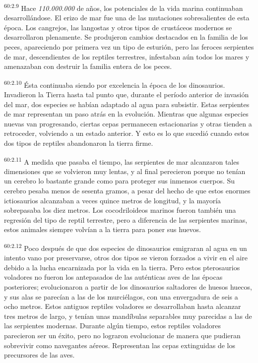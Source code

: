 \par
\textsuperscript{60:2.9} Hace \textit{110.000.000} de años, los potenciales de la vida marina continuaban desarrollándose. El erizo de mar fue una de las mutaciones sobresalientes de esta época. Los cangrejos, las langostas y otros tipos de crustáceos modernos se desarrollaron plenamente. Se produjeron cambios destacados en la familia de los peces, apareciendo por primera vez un tipo de esturión, pero las feroces serpientes de mar, descendientes de los reptiles terrestres, infestaban aún todos los mares y amenazaban con destruir la familia entera de los peces.

\par
\textsuperscript{60:2.10} Ésta continuaba siendo por excelencia la época de los dinosaurios. Invadieron la Tierra hasta tal punto que, durante el período anterior de invasión del mar, dos especies se habían adaptado al agua para subsistir. Estas serpientes de mar representan un paso atrás en la evolución. Mientras que algunas especies nuevas van progresando, ciertas cepas permanecen estacionarias y otras tienden a retroceder, volviendo a un estado anterior. Y esto es lo que sucedió cuando estos dos tipos de reptiles abandonaron la tierra firme.

\par
\textsuperscript{60:2.11} A medida que pasaba el tiempo, las serpientes de mar alcanzaron tales dimensiones que se volvieron muy lentas, y al final perecieron porque no tenían un cerebro lo bastante grande como para proteger sus inmensos cuerpos. Su cerebro pesaba menos de sesenta gramos, a pesar del hecho de que estos enormes ictiosaurios alcanzaban a veces quince metros de longitud, y la mayoría sobrepasaba los diez metros. Los cocodriloideos marinos fueron también una regresión del tipo de reptil terrestre, pero a diferencia de las serpientes marinas, estos animales siempre volvían a la tierra para poner sus huevos.

\par
\textsuperscript{60:2.12} Poco después de que dos especies de dinosaurios emigraran al agua en un intento vano por preservarse, otros dos tipos se vieron forzados a vivir en el aire debido a la lucha encarnizada por la vida en la tierra. Pero estos pterosaurios voladores no fueron los antepasados de las auténticas aves de las épocas posteriores; evolucionaron a partir de los dinosaurios saltadores de huesos huecos, y sus alas se parecían a las de los murciélagos, con una envergadura de seis a ocho metros. Estos antiguos reptiles voladores se desarrollaban hasta alcanzar tres metros de largo, y tenían unas mandíbulas separables muy parecidas a las de las serpientes modernas. Durante algún tiempo, estos reptiles voladores parecieron ser un éxito, pero no lograron evolucionar de manera que pudieran sobrevivir como navegantes aéreos. Representan las cepas extinguidas de los precursores de las aves.

